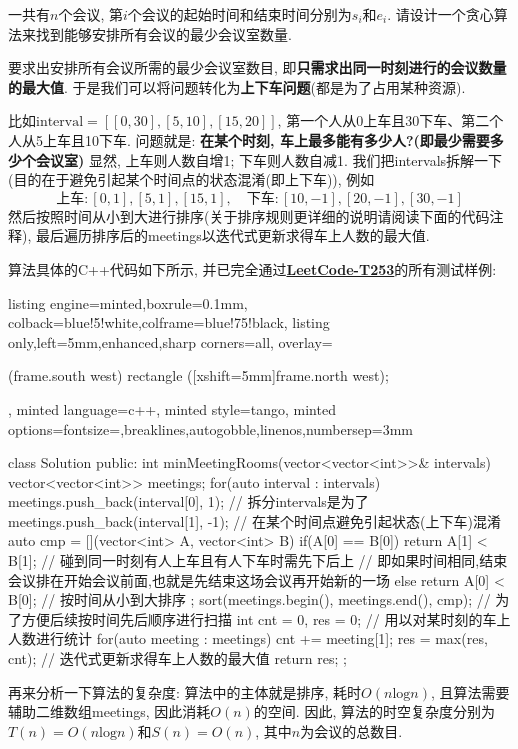 \documentclass{article}
\begin{document}
\pagebreak

\begin{homeworkProblem}
    一共有$n$个会议, 第$i$个会议的起始时间和结束时间分别为$s_i$和$e_i$. 请设计一个贪心算法来找到能够安排所有会议的最少会议室数量.

    \solution 要求出安排所有会议所需的最少会议室数目, 即\textbf{只需求出同一时刻进行的会议数量的最大值}. 于是我们可以将问题转化为\textbf{上下车问题}(都是为了占用某种资源). 
    
    比如$\text{interval}=[[0, 30],[5,10],[15,20]]$, 第一个人从0上车且30下车、第二个人从5上车且10下车. 问题就是: \textbf{在某个时刻, 车上最多能有多少人?(即最少需要多少个会议室)} 显然, 上车则人数自增1; 下车则人数自减1. 我们把intervals拆解一下(目的在于避免引起某个时间点的状态混淆(即上下车)), 例如
    $$
    \text{上车}: \left[ 0,1 \right] ,\left[ 5,1 \right] ,\left[ 15,1 \right] ,\quad \text{下车}: \left[ 10,-1 \right] ,\left[ 20,-1 \right] ,\left[ 30,-1 \right] 
    $$
    然后按照时间从小到大进行排序(关于排序规则更详细的说明请阅读下面的代码注释), 最后遍历排序后的meetings以迭代式更新求得车上人数的最大值. 
    
    算法具体的C++代码如下所示, 并已完全通过\href{https://leetcode.cn/problems/meeting-rooms-ii/}{\textbf{LeetCode-T253}}的所有测试样例:
\begin{tcblisting}{listing engine=minted,boxrule=0.1mm,
colback=blue!5!white,colframe=blue!75!black,
listing only,left=5mm,enhanced,sharp corners=all,
overlay={\begin{tcbclipinterior} (frame.south west)
rectangle ([xshift=5mm]frame.north west);\end{tcbclipinterior}},
minted language=c++,
minted style=tango,
minted options={fontsize=\small,breaklines,autogobble,linenos,numbersep=3mm}}
class Solution {
public:
    int minMeetingRooms(vector<vector<int>>& intervals) {
        vector<vector<int>> meetings;
        for(auto interval : intervals) {
            meetings.push_back({interval[0], 1}); // 拆分intervals是为了
            meetings.push_back({interval[1], -1}); // 在某个时间点避免引起状态(上下车)混淆
        }
        auto cmp = [](vector<int> A, vector<int> B){
            if(A[0] == B[0]) {
                return A[1] < B[1]; // 碰到同一时刻有人上车且有人下车时需先下后上
                // 即如果时间相同,结束会议排在开始会议前面,也就是先结束这场会议再开始新的一场
            }
            else {
                return A[0] < B[0]; // 按时间从小到大排序
            }
        };
        sort(meetings.begin(), meetings.end(), cmp); // 为了方便后续按时间先后顺序进行扫描
        int cnt = 0, res = 0; // 用以对某时刻的车上人数进行统计
        for(auto meeting : meetings) {
            cnt += meeting[1];
            res = max(res, cnt); // 迭代式更新求得车上人数的最大值
        }
        return res;
    }
};
\end{tcblisting}
    再来分析一下算法的复杂度: 算法中的主体就是排序, 耗时$O(n\text{log}n)$, 且算法需要辅助二维数组meetings, 因此消耗$O(n)$的空间. 因此, 算法的时空复杂度分别为$T(n)=O(n\text{log}n)$和$S(n)=O(n)$, 其中$n$为会议的总数目.
\end{homeworkProblem}
\end{document}
